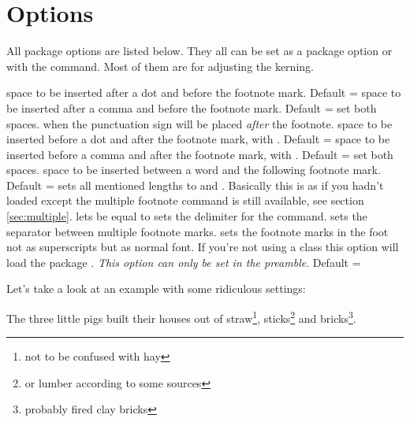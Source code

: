 \documentclass[toc=index,toc=bib]{cnpkgdoc}
\begin{document}
\section{Options}
All package options are listed below. They all can be set as a package option or
with the  command. Most of them are for adjusting the kerning.
\begin{beschreibung}
  space to be inserted after a dot and before the
 footnote mark. Default = \code{-.06em}
  space to be inserted after a comma and before
 the footnote mark. Default = \code{-.06em}
  set both spaces.
  when  the punctuation sign
 will be placed \emph{after} the footnote.
  space to be inserted before a dot and after the
 footnote mark, \ie with . Default = \code{-.15em}
  space to be inserted before a comma and after
 the footnote mark, \ie with . Default = \code{-.15em}
  set both spaces.
  space to be inserted between a word and the
 following footnote mark. Default = \code{.06em}
  sets all mentioned lengths to  and .
 Basically this is as if you hadn't loaded \fnpct except the multiple footnote
 command is still available, see section \ref{sec:multiple}.
  lets  be equal to
  sets the delimiter for the 
 command.
  sets the separator between multiple footnote
 marks.
  sets the footnote marks in the foot
 not as superscripts but as normal font. If you're not using a 
 class this option will load the package . \emph{This option can
 only be set in the preamble}. Default = 
\end{beschreibung}

Let's take a look at an example with some ridiculous settings:
\begin{beispiel}
 \begin{minipage}{.4\linewidth}
  \noindent The three little pigs built their houses
  out of straw\footnote{not to be confused with hay},
  sticks\footnote{or lumber according to some sources}
  and bricks\footnote{probably fired clay bricks}.
 \end{minipage}
\end{beispiel}
\end{document}
